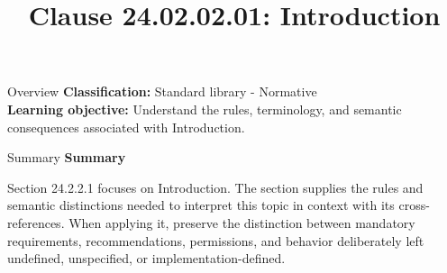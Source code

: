 \documentclass[10pt,letterpaper]{article}
\title{Clause 24.02.02.01: Introduction}
\author{}
\date{}
\begin{document}
\maketitle
\begin{CornellOverviewBox}{Overview}
\textbf{Classification:} Standard library - Normative\\[2pt]
\textbf{Learning objective:} Understand the rules, terminology, and semantic consequences associated with Introduction.
\end{CornellOverviewBox}\begin{CornellSummaryBox}{Summary}
{\sffamily\bfseries\color{Accent} Summary}\par\vspace{3pt}Section 24.2.2.1 focuses on Introduction. The section supplies the rules and semantic distinctions needed to interpret this topic in context with its cross-references. When applying it, preserve the distinction between mandatory requirements, recommendations, permissions, and behavior deliberately left undefined, unspecified, or implementation-defined.
\end{CornellSummaryBox}
\end{document}

